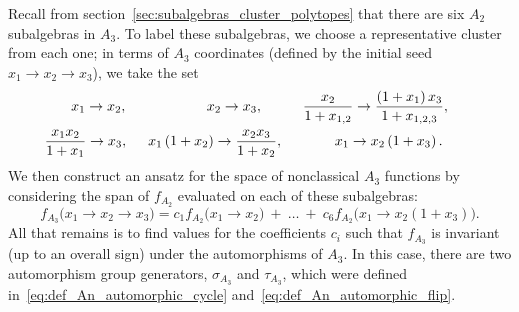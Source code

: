 \documentclass[12pt]{article}
\begin{document}
Recall from section~\ref{sec:subalgebras_cluster_polytopes} that there are six $A_2$ subalgebras in $A_3$. To label these subalgebras, we choose a representative cluster from each one; in terms of $A_3$ coordinates (defined by the initial seed $x_1 \to x_2 \to x_3$), we take the set
\begin{gather}
	x_1 \to x_2, \hspace{2cm}
	x_2 \to x_3, \hspace{1cm}
	\frac{x_2}{1+x_{1,2}} \to \frac{\left(1+x_1\right) x_3}{1+x_{1,2,3}},  \\
	\frac{x_1 x_2}{1+x_1} \to x_3, \hspace{.5cm}
	x_1 \left(1+x_2\right) \to \frac{x_2 x_3}{1+x_2}, \hspace{1.3cm}
	x_1 \to x_2 \left(1+x_3\right). \hspace{.8cm}  \label{eq:a2-in-a3}
\end{gather}
We then construct an ansatz for the space of nonclassical $A_3$ functions by considering the span of $f_{A_2}$ evaluated on each of these subalgebras:
\begin{equation}\label{eq:fa3-ansatz}
	f_{A_3}\big(x_1\to x_2\to x_3 \big) = c_1 f_{A_2}\big(x_1 \to x_2\big) \ +\ \ldots \ +\ c_6 f_{A_2}\big(x_1\to x_2 \left(1+x_3\right)\big).
\end{equation}	
All that remains is to find values for the coefficients $c_i$ such that $f_{A_3}$ is invariant (up to an overall sign) under the automorphisms of $A_3$. In this case, there are two automorphism group generators, $\sigma_{A_3}$ and $\tau_{A_3}$, which were defined in~\eqref{eq:def_An_automorphic_cycle} and~\eqref{eq:def_An_automorphic_flip}.  
\end{document}
